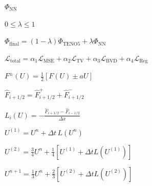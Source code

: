 \documentclass{article}
\begin{document}
\begin{preview}
\hbox{
\color[HTML]{242424}
\fontsize{25}{30.00}\selectfont
$\displaystyle \Phi_{\mathrm{NN}}$
}
\end{preview}
\begin{preview}
\hbox{
\color[HTML]{242424}
\fontsize{25}{30.00}\selectfont
$\displaystyle 0\leq\lambda\leq1$
}
\end{preview}
\begin{preview}
\hbox{
\color[HTML]{242424}
\fontsize{30}{36.00}\selectfont
$\displaystyle \Phi_{\mathrm{final}}=(1-\lambda)\Phi_{\mathrm{TENO5}}+\lambda\Phi_{\mathrm{NN}}$
}
\end{preview}
\begin{preview}
\hbox{
\color[HTML]{242424}
\fontsize{30}{36.00}\selectfont
$\displaystyle \boxed{\mathcal{L}_{\mathrm{total}}=\alpha_1\mathcal{L}_{\mathrm{MSE}}+\alpha_2\mathcal{L}_{\mathrm{TV}}+\alpha_3\mathcal{L}_{\mathrm{BVD}}+\alpha_4\mathcal{L}_{\mathrm{Reg}}}$
}
\end{preview}
\begin{preview}
\hbox{
\color[HTML]{242424}
\fontsize{24}{28.80}\selectfont
$\displaystyle F^{\pm}(U)=\tfrac{1}{2}\left[F(U)\pm aU\right]$
}
\end{preview}
\begin{preview}
\hbox{
\color[HTML]{242424}
\fontsize{24}{28.80}\selectfont
$\displaystyle \hat F_{i+1/2}=\hat F^{+}_{i+1/2}+\hat F^{-}_{i+1/2}$
}
\end{preview}
\begin{preview}
\hbox{
\color[HTML]{242424}
\fontsize{24}{28.80}\selectfont
$\displaystyle L_i(U)=-\frac{\hat F_{i+1/2}-\hat F_{i-1/2}}{\Delta x}$
}
\end{preview}
\begin{preview}
\hbox{
\color[HTML]{242424}
\fontsize{24}{28.80}\selectfont
$\displaystyle U^{(1)}=U^n+\Delta t\,L(U^n)$
}
\end{preview}
\begin{preview}
\hbox{
\color[HTML]{242424}
\fontsize{22}{26.40}\selectfont
$\displaystyle U^{(2)}=\tfrac{3}{4}U^n+\tfrac{1}{4}\left[U^{(1)}+\Delta t L(U^{(1)})\right]$
}
\end{preview}
\begin{preview}
\hbox{
\color[HTML]{242424}
\fontsize{22}{26.40}\selectfont
$\displaystyle U^{n+1}=\tfrac{1}{3}U^n+\tfrac{2}{3}\left[U^{(2)}+\Delta t L(U^{(2)})\right]$
}
\end{preview}
\end{document}
